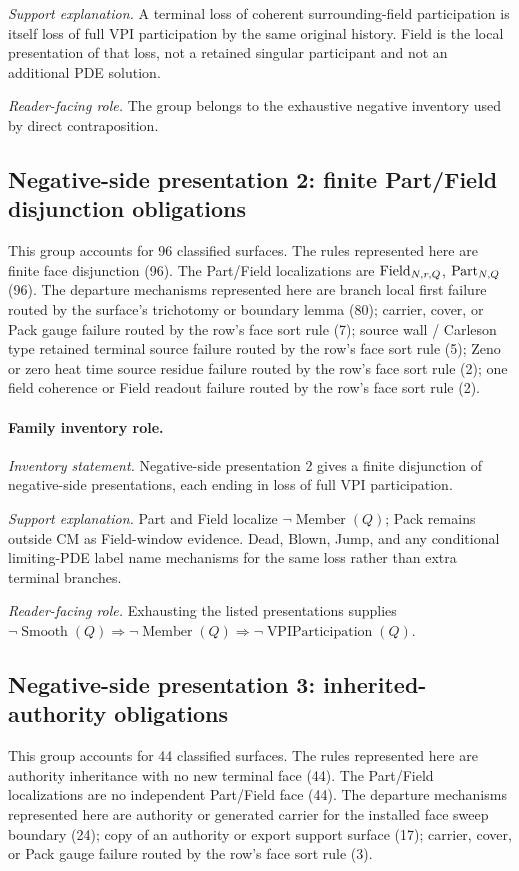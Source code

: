 \emph{Support explanation.} A terminal loss of coherent surrounding-field participation is itself loss of full VPI participation by the same original history. Field is the local presentation of that loss, not a retained singular participant and not an additional PDE solution.

\emph{Reader-facing role.} The group belongs to the exhaustive negative inventory used by direct contraposition.

\subsection{Negative-side presentation 2: finite Part/Field disjunction obligations}
This group accounts for 96 classified surfaces. The rules represented here are finite face disjunction (96). The Part/Field localizations are \(\mathrm{Field}_{N,r,Q}\), \(\mathrm{Part}_{N,Q}\) (96). The departure mechanisms represented here are branch local first failure routed by the surface's trichotomy or boundary lemma (80); carrier, cover, or Pack gauge failure routed by the row's face sort rule (7); source wall / Carleson type retained terminal source failure routed by the row's face sort rule (5); Zeno or zero heat time source residue failure routed by the row's face sort rule (2); one field coherence or Field readout failure routed by the row's face sort rule (2).

\paragraph{Family inventory role.}
\emph{Inventory statement.} Negative-side presentation 2 gives a finite disjunction of negative-side presentations, each ending in loss of full VPI participation.

\emph{Support explanation.} Part and Field localize \(\neg\operatorname{Member}(Q)\); Pack remains outside CM as Field-window evidence. Dead, Blown, Jump, and any conditional limiting-PDE label name mechanisms for the same loss rather than extra terminal branches.

\emph{Reader-facing role.} Exhausting the listed presentations supplies \(\neg\operatorname{Smooth}(Q)\Rightarrow\neg\operatorname{Member}(Q)\Rightarrow\neg\operatorname{VPIParticipation}(Q)\).

\subsection{Negative-side presentation 3: inherited-authority obligations}
This group accounts for 44 classified surfaces. The rules represented here are authority inheritance with no new terminal face (44). The Part/Field localizations are no independent Part/Field face (44). The departure mechanisms represented here are authority or generated carrier for the installed face sweep boundary (24); copy of an authority or export support surface (17); carrier, cover, or Pack gauge failure routed by the row's face sort rule (3).

